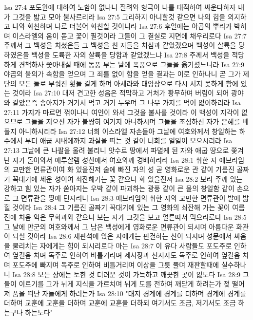 Isa 27:4  포도원에 대하여 노함이 없나니 질려와 형극이 나를 대적하여 싸운다하자 내가 그것을 밟고 모아 불사르리라
Isa 27:5  그리하지 아니할것 같으면 나의 힘을 의지하고 나와 화친하며 나로 더불어 화친할 것이니라
Isa 27:6  후일에는 야곱의 뿌리가 박히며 이스라엘의 움이 돋고 꽃이 필것이라 그들이 그 결실로 지면에 채우리로다
Isa 27:7  주께서 그 백성을 치셨은들 그 백성을 친 자들을 치심과 같았겠으며 백성이 살륙을 당하였은들 백성을 도륙한 자의 살륙을 당함과 같았겠느냐
Isa 27:8  주께서 백성을 적당하게 견책하사 쫓아내실 때에 동풍 부는 날에 폭풍으로 그들을 옮기셨느니라
Isa 27:9  야곱의 불의가 속함을 얻으며 그 죄를 없이 함을 얻을 결과는 이로 인하나니 곧 그가 제단의 모든 돌로 부숴진 횟돌 같게 하며 아세라와 태양상으로 다시 서지 못하게 함에 있는 것이라
Isa 27:10  대저 견고한 성읍은 적막하고 거처가 황무하며 버림이 되어 광야와 같았은즉 송아지가 거기서 먹고 거기 누우며 그 나무 가지를 먹어 없이하리라
Isa 27:11  가지가 마르면 꺾이나니 여인이 와서 그것을 불사를 것이라 이 백성이 지각이 없으므로 그들을 지으신 자가 불쌍히 여기지 아니하시며 그들을 조성하신 자가 은혜를 베풀지 아니하시리라
Isa 27:12  너희 이스라엘 자손들아 그날에 여호와께서 창일하는 하수에서 부터 애굽 시내에까지 과실을 떠는 것 같이 너희를 일일이 모으시리라
Isa 27:13  그날에 큰 나팔을 울려 불리니 앗수르 땅에서 파멸케 된 자와 애굽 땅으로 쫓겨난 자가 돌아와서 예루살렘 성산에서 여호와께 경배하리라
Isa 28:1  취한 자 에브라임의 교만한 면류관이여 화 있을진저 술에 빠진 자의 성 곧 영화로운 관 같이 기름진 골짜기 꼭대기에 세운 성이여 쇠잔해가는 꽃 같으니 화 있을진저
Isa 28:2  보라 주께 있는 강하고 힘 있는 자가 쏟아지는 우박 같이 파괴하는 광풍 같이 큰 물의 창일함 같이 손으로 그 면류관을 땅에 던지리니
Isa 28:3  에브라임의 취한 자의 교만한 면류관이 발에 밟힐 것이라
Isa 28:4  그 기름진 골짜기 꼭대기에 있는 그 영화의 쇠잔해 가는 꽃이 여름 전에 처음 익은 무화과와 같으니 보는 자가 그것을 보고 얼른따서 먹으리로다
Isa 28:5  그 날에 만군의 여호와께서 그 남은 백성에게 영화로운 면류관이 되시며 아름다운 화관이 되실 것이라
Isa 28:6  재판석에 앉은 자에게는 판결하는 신이 되시며 성문에서 싸움을 물리치는 자에게는 힘이 되시리로다 마는
Isa 28:7  이 유다 사람들도 포도주로 인하여 옆걸음 치며 독주로 인하여 비틀거리며 제사장과 선지자도 독주로 인하여 옆걸음 치며 포도주에 빠지며 독주로 인하여 비틀거리며 이상을 그릇 풀며 재판할때에 실수하나니
Isa 28:8  모든 상에는 토한 것 더러운 것이 가득하고 깨끗한 곳이 없도다
Isa 28:9  그들이 이르기를 그가 뉘게 지식을 가르치며 뉘게 도를 전하여 깨닫게 하려는가 젖 떨어져 품을 떠난 자들에게 하려는가
Isa 28:10  "대저 경계에 경계를 더하며 경계에 경계를 더하며 교훈에 교훈을 더하며 교훈에 교훈을 더하되 여기서도 조금, 저기서도 조금 하는구나 하는도다"
